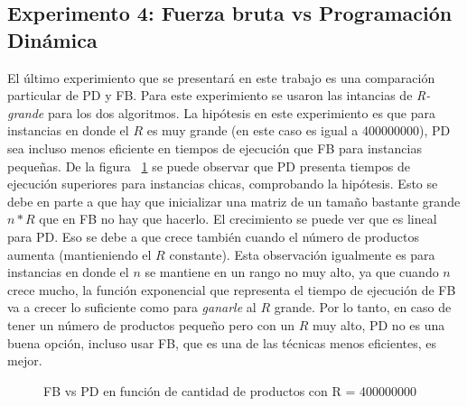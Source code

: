 \documentclass[10pt,a4paper]{article}
\begin{document}
\subsection{Experimento 4: Fuerza bruta vs Programación Dinámica}
El último experimiento que se presentará en este trabajo es una comparación particular de PD y FB. Para este experimiento se usaron las intancias de \textit{R-grande} para los dos algoritmos. La hipótesis en este experimiento es que para instancias en donde el $R$ es muy grande (en este caso es igual a 400000000), PD sea incluso menos eficiente en tiempos de ejecución que FB para instancias pequeñas. De la figura ~\ref{fig:fb-pd-R-grande} se puede observar que PD presenta tiempos de ejecución superiores para instancias chicas, comprobando la hipótesis. Esto se debe en parte a que hay que inicializar una matriz de un tamaño bastante grande $n * R$ que en FB no hay que hacerlo. El crecimiento se puede ver que es lineal para PD. Eso se debe a que crece también cuando el número de productos aumenta (mantieniendo el $R$ constante). Esta observación igualmente es para instancias en donde el $n$ se mantiene en un rango no muy alto, ya que cuando $n$ crece mucho, la función exponencial que representa el tiempo de ejecución de FB va a crecer lo suficiente como para \textit{ganarle} al $R$ grande. Por lo tanto, en caso de tener un número de productos pequeño pero con un $R$ muy alto, PD no es una buena opción, incluso usar FB, que es una de las técnicas menos eficientes, es mejor.


\begin{figure}[H]
        \centering
        
\caption{FB vs PD en función de cantidad de productos con R = 400000000}
\label{fig:fb-pd-R-grande}
\end{figure}
\end{document}
